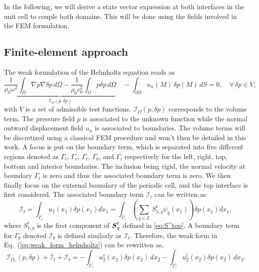 In the following, we will derive a state vector expression at both interfaces in the unit cell to couple both domains. This will be done using the fields involved in the FEM formulation.

\subsection{\label{fem-periodic}Finite-element approach}

The weak formulation of the Helmholtz equation \cite{dhatt2005} reads as
\begin{equation}
        \underbrace{\frac 1 {\rho_0 \omega^2} \int_\Omega \nabla p \nabla \delta p \, d\Omega  - \frac 1 {\rho_0 c_0^2} \int_\Omega p \delta p \, d\Omega}_{\mathcal I_{\Omega} (p,\delta p)} \quad - \int_{\partial \Omega} u_n(M) \,\delta p(M)\,dS = 0, \quad \forall\, \delta p \in V,
        \label{eq:weak_form_helmholtz}
\end{equation}
with $V$ is a set of admissible test functions. $\mathcal I_{\Omega} (p,\delta p)$ corresponds to the volume term. The pressure field $p$ is associated to the unknown function while the normal outward displacement field $u_n$ is associated to boundaries. The volume terms will be discretized using a classical FEM procedure \cite{atalla2015,solin2004} and won't then be detailed in this work. A focus is put on the boundary term, which is separated into five different regions denoted as $\Gamma_l$, $\Gamma_r$, $\Gamma_t$, $\Gamma_b$, and $\Gamma_i$ respectively for the left, right, top, bottom and interior boundaries. The inclusion being rigid, the normal velocity at boundary $\Gamma_i$ is zero and thus the associated boundary term is zero. We then finally focus on the external boundary of the periodic cell, and the top interface is first considered. The associated boundary term $\mathcal I_t$ can be written as
\begin{equation}
        \mathcal I_t = \int_{\Gamma_t} u_2(x_1)\delta p(x_1) dx_1 = \int_{\Gamma_t}\left( \sum_{q \in \mathbb Z} \,S^{t}_{1,q} \psi_q(x_1)  \right)\delta p(x_1) dx_1
    \label{eq:top_boundary},
\end{equation}
where $S^t_{1, q}$ is the first component of $\boldsymbol S^t_q$ defined in \cref{eq:S^top}. A boundary term for $\Gamma_b$ denoted $\mathcal I_b$ is defined similarly as $\mathcal I_t$. Therefore, the weak form in Eq.~(\ref{eq:weak_form_helmholtz}) can be rewritten as,
\begin{equation}
        \mathcal I_{\Omega_1} (p,\delta p) + \mathcal I_t + \mathcal I_b = - \int_{\Gamma_{r}} u_2^{r}(x_2) \delta p (x_2)\,dx_2 - \int_{\Gamma_{l}} u_2^{l}(x_2) \delta p (x_2) \,dx_2.
        \label{eq:weak_form_bloch}
\end{equation}

